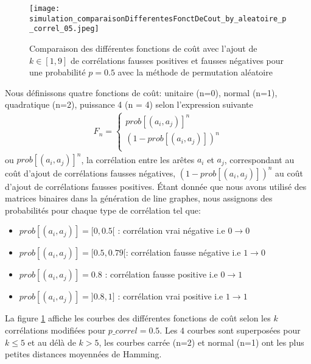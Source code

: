 \label{fonctionDeCout}

\begin{figure}[htb!] 
\centering
\texttt{[image: simulation\_comparaisonDifferentesFonctDeCout\_by\_aleatoire\_p\_correl\_05.jpeg]}
\caption{ Comparaison des diff\'erentes fonctions de co\^ut avec l'ajout de $k \in [1,9]$ de corr\'elations fausses positives et fausses n\'egatives pour une probabilit\'e $p = 0.5$ avec la m\'ethode de permutation al\'eatoire }
\label{compareDifferentesFonctionDeCout_p05} 
\end{figure}

Nous d\'efinissons quatre fonctions de co\^ut: unitaire (n=0), normal (n=1), quadratique (n=2), puissance 4 (n = 4) selon l'expression suivante
\begin{equation}
	\begin{aligned}
	F_n = 
	\begin{cases}
		prob[(a_i,a_j)]^n   \\
		(1 - prob[(a_i,a_j)])^n \\
	\end{cases}
	\end{aligned}
\end{equation}
ou $prob[(a_i,a_j)]^n$, la corr\'elation entre les ar\^etes $a_i$ et $a_j$, correspondant au co\^ut d'ajout de corr\'elations fausses n\'egatives, 
$(1-prob[(a_i,a_j)])^n$ au co\^ut d'ajout de corr\'elations fausses positives.
\newline
\'Etant donn\'ee que nous avons utilis\'e des matrices binaires dans la g\'en\'eration de line graphes, nous assignons des probabilit\'es pour chaque type de corr\'elation tel que:
\begin{itemize}
\item $prob[(a_i,a_j)] = [0, 0.5[ $ : corr\'elation vrai n\'egative i.e $0 \rightarrow 0$
\item $prob[(a_i,a_j)] = [0.5, 0.79[ $: corr\'elation fausse n\'egative i.e $1 \rightarrow 0$
\item $prob[(a_i,a_j)] = 0.8 $ : corr\'elation fausse positive i.e $0 \rightarrow 1$
\item $prob[(a_i,a_j)] = ]0.8, 1] $ : corr\'elation vrai positive i.e $1 \rightarrow 1$
\end{itemize}
La figure \ref{compareDifferentesFonctionDeCout_p05} affiche les courbes des diff\'erentes fonctions de co\^ut selon les $k$ corr\'elations modifi\'ees pour $p\_correl = 0.5$.
\newline
Les $4$ courbes sont superpos\'ees pour $k\le5$ et au d\'el\`a de $k>5$, les courbes carr\'ee (n=2) et normal (n=1) ont les plus petites distances moyenn\'ees de Hamming.
